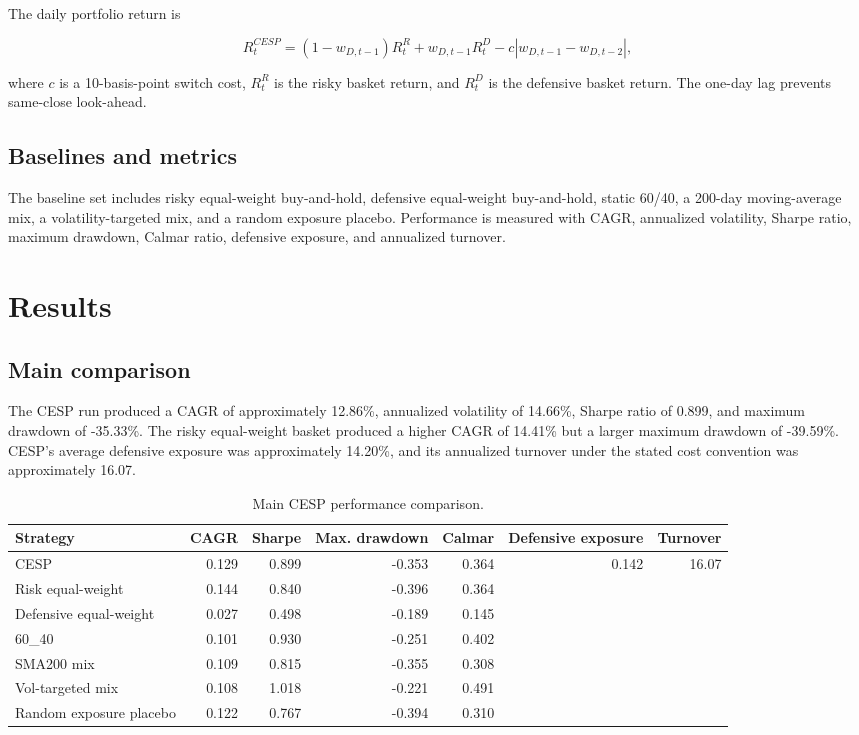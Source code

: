 \documentclass[11pt]{article}
\begin{document}
The daily portfolio return is

\begin{equation}
R^{CESP}_t=
(1-w_{D,t-1})R^R_t+
w_{D,t-1}R^D_t-
c|w_{D,t-1}-w_{D,t-2}|,
\end{equation}

where $c$ is a 10-basis-point switch cost, $R^R_t$ is the risky basket return,
and $R^D_t$ is the defensive basket return. The one-day lag prevents same-close
look-ahead.

\subsection{Baselines and metrics}

The baseline set includes risky equal-weight buy-and-hold, defensive equal-weight
buy-and-hold, static 60/40, a 200-day moving-average mix, a volatility-targeted mix,
and a random exposure placebo. Performance is measured with CAGR, annualized
volatility, Sharpe ratio, maximum drawdown, Calmar ratio, defensive exposure,
and annualized turnover.

\section{Results}

\subsection{Main comparison}

The CESP run produced a CAGR of approximately 12.86\%, annualized volatility
of 14.66\%, Sharpe ratio of 0.899, and maximum drawdown of -35.33\%. The risky
equal-weight basket produced a higher CAGR of 14.41\% but a larger maximum
drawdown of -39.59\%. CESP's average defensive exposure was approximately
14.20\%, and its annualized turnover under the stated cost convention was
approximately 16.07.

\begin{table}[H]
\centering
\caption{Main CESP performance comparison.}
\scriptsize
\begin{tabular}{lrrrrrr}
\toprule
Strategy & CAGR & Sharpe & Max. drawdown & Calmar & Defensive exposure & Turnover \\
\midrule
CESP & 0.129 & 0.899 & -0.353 & 0.364 & 0.142 & 16.07 \\
Risk equal-weight & 0.144 & 0.840 & -0.396 & 0.364 & & \\
Defensive equal-weight & 0.027 & 0.498 & -0.189 & 0.145 & & \\
60\_40 & 0.101 & 0.930 & -0.251 & 0.402 & & \\
SMA200 mix & 0.109 & 0.815 & -0.355 & 0.308 & & \\
Vol-targeted mix & 0.108 & 1.018 & -0.221 & 0.491 & & \\
Random exposure placebo & 0.122 & 0.767 & -0.394 & 0.310 & & \\
\bottomrule
\end{tabular}
\end{table}
\end{document}
